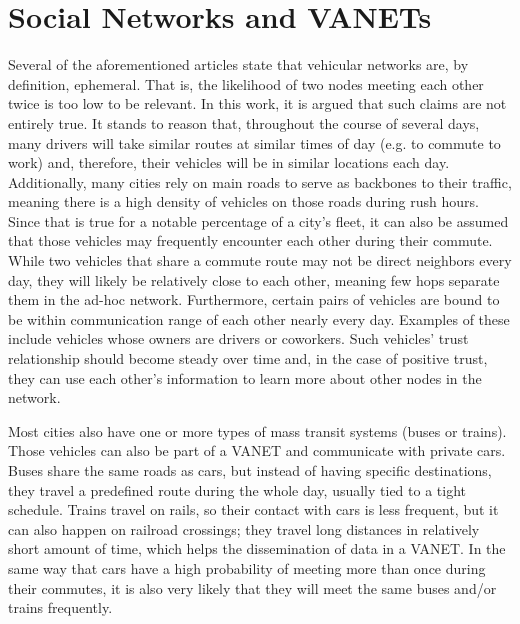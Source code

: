 \section{Social Networks and VANETs}
\label{section:socialvanets}
Several of the aforementioned articles state that vehicular networks are, by definition, ephemeral.
That is, the likelihood of two nodes meeting each other twice is too low to be relevant.
In this work, it is argued that such claims are not entirely true.
It stands to reason that, throughout the course of several days, many drivers will take similar routes at similar times of day (e.g. to commute to work) and, therefore, their vehicles will be in similar locations each day.
Additionally, many cities rely on main roads to serve as backbones to their traffic, meaning there is a high density of vehicles on those roads during rush hours.
Since that is true for a notable percentage of a city's fleet, it can also be assumed that those vehicles may frequently encounter each other during their commute.
While two vehicles that share a commute route may not be direct neighbors every day, they will likely be relatively close to each other, meaning few hops separate them in the ad-hoc network.
Furthermore, certain pairs of vehicles are bound to be within communication range of each other nearly every day.
Examples of these include vehicles whose owners are drivers or coworkers.
Such vehicles' trust relationship should become steady over time and, in the case of positive trust, they can use each other's information to learn more about other nodes in the network.



Most cities also have one or more types of mass transit systems (buses or trains).
Those vehicles can also be part of a VANET and communicate with private cars.
Buses share the same roads as cars, but instead of having specific destinations, they travel a predefined route during the whole day, usually tied to a tight schedule.
Trains travel on rails, so their contact with cars is less frequent, but it can also happen on railroad crossings; they travel long distances in relatively short amount of time, which helps the dissemination of data in a VANET.
In the same way that cars have a high probability of meeting more than once during their commutes, it is also very likely that they will meet the same buses and/or trains frequently.

